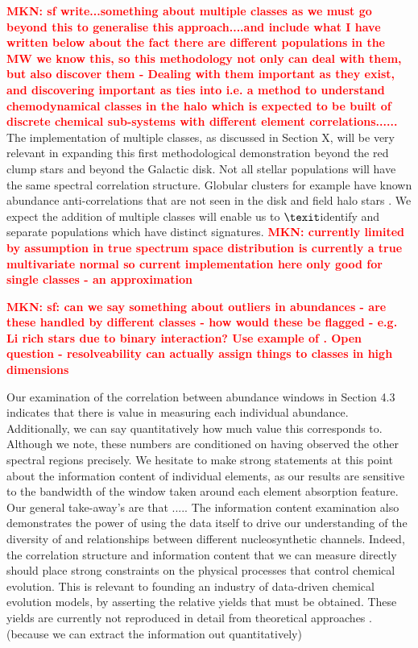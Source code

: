 \documentclass[a4paper,fleqn,usenatbib]{mnras}
\newcommand{\mkn}[1]{\textbf{\textcolor{red}{MKN: #1}}}
\begin{document}
\mkn{ sf write...something about multiple classes as we must go beyond this to generalise this approach....and include what I have written below about the fact there are different populations in the MW we know this, so this methodology not only can deal with them, but also discover them -  Dealing with them important as they exist, and discovering important as ties into i.e. a method to understand chemodynamical classes in the halo which is expected to be built of discrete chemical sub-systems with different element correlations......} The implementation of multiple classes, as discussed in Section X, will be very relevant in expanding this first methodological demonstration beyond the red clump stars and beyond the Galactic disk. Not all stellar populations will have the same spectral correlation structure. Globular clusters for example have known abundance anti-correlations that are not seen in the disk and field halo stars \citep{}. We expect the addition of multiple classes will enable us to $\texit${identify} and separate populations which have distinct signatures. \mkn{currently limited by assumption in true spectrum space distribution is currently a true multivariate normal so current implementation here only good for single classes - an approximation} 
 
 \mkn{ sf: can we say something about outliers in abundances - are these handled by different classes - how would these be flagged - e.g. Li rich stars due to binary interaction? Use example of \citep{Casey2019}. Open question - resolveability can actually assign things to classes in high dimensions} 
 
 Our examination of the correlation between abundance windows in Section 4.3 indicates that there is value in measuring each individual abundance. Additionally, we can say quantitatively how much value this corresponds to. Although we note, these numbers are conditioned on having observed the other spectral regions precisely. We hesitate to make strong statements at this point about the information content of individual elements, as our results are sensitive to the bandwidth of the window taken around each element absorption feature. Our general take-away's are that ..... The information content examination also demonstrates the power of using the data itself to drive our understanding of the diversity of and relationships between different nucleosynthetic channels. Indeed, the correlation structure and information content that we can measure directly should place strong constraints on the physical processes that control chemical evolution. This is relevant to founding an industry of data-driven chemical evolution models, by asserting the relative yields that must be obtained. These yields are currently not reproduced in detail from theoretical approaches \citep[e.g.][and Blancato, submitted, 2019]{Jan2017}. (because we can extract the information out quantitatively) 
 
\end{document}
